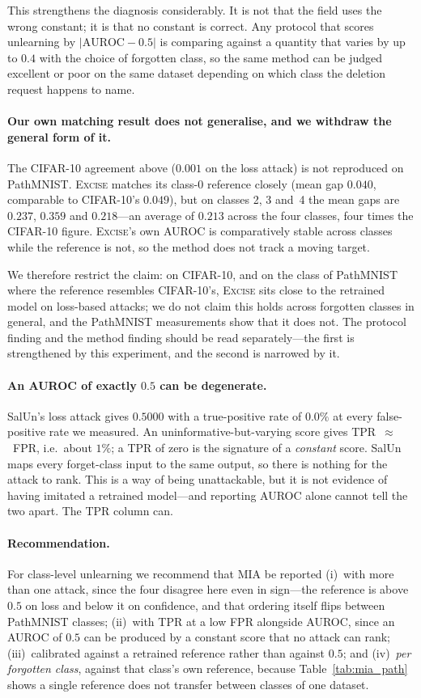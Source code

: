 \documentclass{article}
\newcommand{\ours}{\textsc{Excise}}
\theoremstyle{remark}
\theoremstyle{plain}
\begin{document}
This strengthens the diagnosis considerably. It is not that the field uses the
wrong constant; it is that no constant is correct. Any protocol that scores
unlearning by $|\mathrm{AUROC} - 0.5|$ is comparing against a quantity that
varies by up to $0.4$ with the choice of forgotten class, so the same method can
be judged excellent or poor on the same dataset depending on which class the
deletion request happens to name.

\paragraph{Our own matching result does not generalise, and we withdraw the
general form of it.} The CIFAR-10 agreement above ($0.001$ on the loss attack)
is not reproduced on PathMNIST. \ours{} matches its class-0 reference closely
(mean gap $0.040$, comparable to CIFAR-10's $0.049$), but on classes 2, 3 and~4
the mean gaps are $0.237$, $0.359$ and $0.218$---an average of $0.213$ across
the four classes, four times the CIFAR-10 figure. \ours{}'s own AUROC is
comparatively stable across classes while the reference is not, so the method
does not track a moving target.

We therefore restrict the claim: on CIFAR-10, and on the class of PathMNIST
where the reference resembles CIFAR-10's, \ours{} sits close to the retrained
model on loss-based attacks; we do not claim this holds across forgotten classes
in general, and the PathMNIST measurements show that it does not. The protocol
finding and the method finding should be read separately---the first is
strengthened by this experiment, and the second is narrowed by it.

\paragraph{An AUROC of exactly $0.5$ can be degenerate.}
SalUn's loss attack gives $0.5000$ with a true-positive rate of $0.0\%$ at every
false-positive rate we measured. An uninformative-but-varying score gives
TPR~$\approx$~FPR, i.e.\ about $1\%$; a TPR of zero is the signature of a
\emph{constant} score. SalUn maps every forget-class input to the same output,
so there is nothing for the attack to rank. This is a way of being unattackable,
but it is not evidence of having imitated a retrained model---and reporting
AUROC alone cannot tell the two apart. The TPR column can.

\paragraph{Recommendation.}
For class-level unlearning we recommend that MIA be reported (i)~with more than
one attack, since the four disagree here even in sign---the reference is above
$0.5$ on loss and below it on confidence, and that ordering itself flips between
PathMNIST classes; (ii)~with TPR at a low FPR alongside AUROC, since an AUROC of
$0.5$ can be produced by a constant score that no attack can rank;
(iii)~calibrated against a retrained reference rather than against $0.5$; and
(iv)~\emph{per forgotten class}, against that class's own reference, because
Table~\ref{tab:mia_path} shows a single reference does not transfer between
classes of one dataset.
\end{document}
